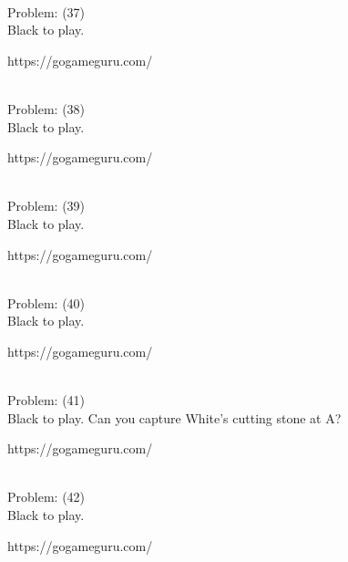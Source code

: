 \documentclass[11pt]{article}
\begin{document}
\begin{minipage}[t]{0.5\textwidth}
  {\centering
  
\\
  Problem: (37)\\
  Black to play.

https://gogameguru.com/\\
  }
\end{minipage}
\begin{minipage}[t]{0.5\textwidth}
  {\centering
  
\\
  Problem: (38)\\
  Black to play.

https://gogameguru.com/\\
  }
\end{minipage}
\begin{minipage}[t]{0.5\textwidth}
  {\centering
  
\\
  Problem: (39)\\
  Black to play.

https://gogameguru.com/\\
  }
\end{minipage}
\begin{minipage}[t]{0.5\textwidth}
  {\centering
  
\\
  Problem: (40)\\
  Black to play.

https://gogameguru.com/\\
  }
\end{minipage}
\begin{minipage}[t]{0.5\textwidth}
  {\centering
  
\\
  Problem: (41)\\
  Black to play. Can you capture White's cutting stone at A?

https://gogameguru.com/\\
  }
\end{minipage}
\begin{minipage}[t]{0.5\textwidth}
  {\centering
  
\\
  Problem: (42)\\
  Black to play.

https://gogameguru.com/\\
  }
\end{minipage}
\end{document}
